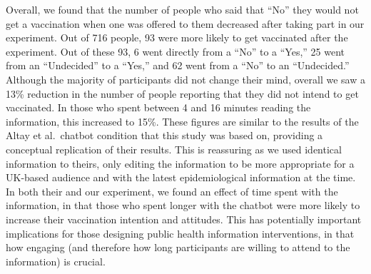 \documentclass[
  english,
  ,jou,floatsintext]{apa6}
\begin{document}
Overall, we found that the number of people who said that ``No'' they would not get a vaccination when one was offered to them decreased after taking part in our experiment. Out of 716 people, 93 were more likely to get vaccinated after the experiment. Out of these 93, 6 went directly from a ``No'' to a ``Yes,'' 25 went from an ``Undecided'' to a ``Yes,'' and 62 went from a ``No'' to an ``Undecided.'' Although the majority of participants did not change their mind, overall we saw a 13\% reduction in the number of people reporting that they did not intend to get vaccinated. In those who spent between 4 and 16 minutes reading the information, this increased to 15\%. These figures are similar to the results of the Altay et al.~chatbot condition that this study was based on, providing a conceptual replication of their results. This is reassuring as we used identical information to theirs, only editing the information to be more appropriate for a UK-based audience and with the latest epidemiological information at the time. In both their and our experiment, we found an effect of time spent with the information, in that those who spent longer with the chatbot were more likely to increase their vaccination intention and attitudes. This has potentially important implications for those designing public health information interventions, in that how engaging (and therefore how long participants are willing to attend to the information) is crucial.
\end{document}
